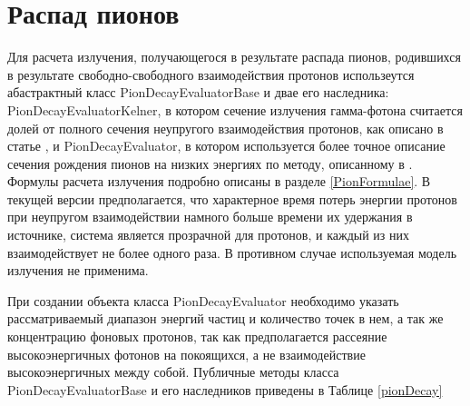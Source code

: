 \section{Распад пионов}

Для расчета излучения, получающегося в результате распада пионов, родившихся в результате свободно-свободного взаимодействия протонов использеутся абастрактный класс PionDecayEvaluatorBase и двае его наследника: PionDecayEvaluatorKelner, в котором сечение излучения гамма-фотона считается долей от полного сечения неупругого взаимодействия протонов, как описано в статье \cite{Kelner}, и PionDecayEvaluator, в котором используется более точное описание сечения рождения пионов на низких энергиях по методу, описанному в \cite{Kafexhiu}. Формулы расчета излучения подробно описаны в разделе \ref{PionFormulae}. В текущей версии предполагается, что характерное время потерь энергии протонов при неупругом взаимодействии намного больше времени их удержания в источнике, система является прозрачной для протонов, и каждый из них взаимодействует не более одного раза. В противном случае используемая модель излучения не применима.

При создании объекта класса PionDecayEvaluator необходимо указать рассматриваемый диапазон энергий частиц и количество точек в нем, а так же концентрацию фоновых протонов, так как предполагается рассеяние высокоэнергичных фотонов на покоящихся, а не взаимодействие высокоэнергичных между собой. Публичные методы класса PionDecayEvaluatorBase и его наследников приведены в Таблице \ref{pionDecay}

